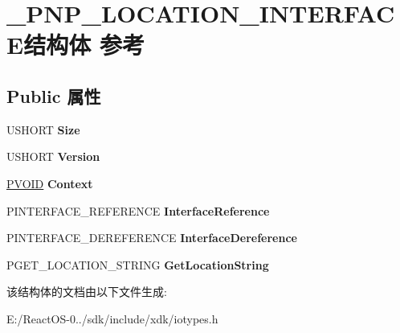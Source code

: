 \hypertarget{struct___p_n_p___l_o_c_a_t_i_o_n___i_n_t_e_r_f_a_c_e}{}\section{\+\_\+\+P\+N\+P\+\_\+\+L\+O\+C\+A\+T\+I\+O\+N\+\_\+\+I\+N\+T\+E\+R\+F\+A\+C\+E结构体 参考}
\label{struct___p_n_p___l_o_c_a_t_i_o_n___i_n_t_e_r_f_a_c_e}
\subsection*{Public 属性}
\begin{DoxyCompactItemize}
\item 
\mbox{\label{struct___p_n_p___l_o_c_a_t_i_o_n___i_n_t_e_r_f_a_c_e_a8af41b24d9c2f33697509bcbe1537424}} 
U\+S\+H\+O\+RT {\bfseries Size}
\item 
\mbox{\label{struct___p_n_p___l_o_c_a_t_i_o_n___i_n_t_e_r_f_a_c_e_a943a3851d0e4f31994045b8e29bd2b4f}} 
U\+S\+H\+O\+RT {\bfseries Version}
\item 
\mbox{\label{struct___p_n_p___l_o_c_a_t_i_o_n___i_n_t_e_r_f_a_c_e_a646cd9b3b0900b0493cf245f250276ca}} 
\hyperlink{interfacevoid}{P\+V\+O\+ID} {\bfseries Context}
\item 
\mbox{\label{struct___p_n_p___l_o_c_a_t_i_o_n___i_n_t_e_r_f_a_c_e_ac57b84cf187299976fd13ba611151dcc}} 
P\+I\+N\+T\+E\+R\+F\+A\+C\+E\+\_\+\+R\+E\+F\+E\+R\+E\+N\+CE {\bfseries Interface\+Reference}
\item 
\mbox{\label{struct___p_n_p___l_o_c_a_t_i_o_n___i_n_t_e_r_f_a_c_e_ac74cd784c14b07d1ca62290b30e4c997}} 
P\+I\+N\+T\+E\+R\+F\+A\+C\+E\+\_\+\+D\+E\+R\+E\+F\+E\+R\+E\+N\+CE {\bfseries Interface\+Dereference}
\item 
\mbox{\label{struct___p_n_p___l_o_c_a_t_i_o_n___i_n_t_e_r_f_a_c_e_a3e6d9898cd4bc9619eb36a8518be7732}} 
P\+G\+E\+T\+\_\+\+L\+O\+C\+A\+T\+I\+O\+N\+\_\+\+S\+T\+R\+I\+NG {\bfseries Get\+Location\+String}
\end{DoxyCompactItemize}


该结构体的文档由以下文件生成\+:\begin{DoxyCompactItemize}
\item 
E\+:/\+React\+O\+S-\/0../sdk/include/xdk/iotypes.\+h\end{DoxyCompactItemize}

